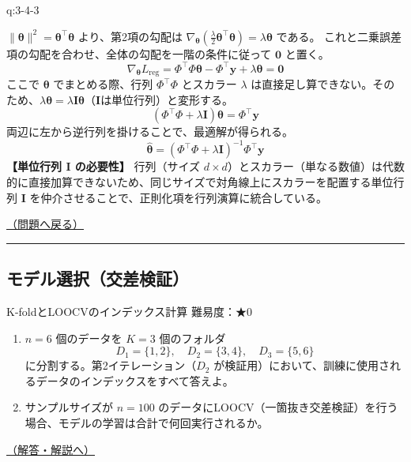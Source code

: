\begin{answerbox}[phantomlabel=a:3-4-3]{q:3-4-3}

\(\|\boldsymbol{\theta}\|^2 = \boldsymbol{\theta}^\top \boldsymbol{\theta}\)
より、第2項の勾配は
\(\nabla_{\boldsymbol{\theta}} \left( \frac{\lambda}{2} \boldsymbol{\theta}^\top \boldsymbol{\theta} \right) = \lambda \boldsymbol{\theta}\)
である。 これと二乗誤差項の勾配を合わせ、全体の勾配を一階の条件に従って
\(\mathbf{0}\) と置く。 \[
\nabla_{\boldsymbol{\theta}} L_{\text{reg}} = \Phi^\top \Phi \boldsymbol{\theta} - \Phi^\top \mathbf{y} + \lambda \boldsymbol{\theta} = \mathbf{0}
\] ここで \(\boldsymbol{\theta}\) でまとめる際、行列 \(\Phi^\top \Phi\)
とスカラー \(\lambda\)
は直接足し算できない。そのため、\(\lambda \boldsymbol{\theta} = \lambda \mathbf{I} \boldsymbol{\theta}\)（\(\mathbf{I}\)は単位行列）と変形する。
\[
(\Phi^\top \Phi + \lambda \mathbf{I})\boldsymbol{\theta} = \Phi^\top \mathbf{y}
\] 両辺に左から逆行列を掛けることで、最適解が得られる。 \[
\hat{\boldsymbol{\theta}} = (\Phi^\top \Phi + \lambda \mathbf{I})^{-1}\Phi^\top \mathbf{y}
\] \textbf{【単位行列 $\mathbf{I}$ の必要性】} 行列（サイズ
\(d \times d\)）とスカラー（単なる数値）は代数的に直接加算できないため、同じサイズで対角線上にスカラーを配置する単位行列
\(\mathbf{I}\) を仲介させることで、正則化項を行列演算に統合している。

\hfill 

\hyperref[q:3-4-3]{（問題へ戻る）}

\begin{center}\rule{0.5\linewidth}{0.5pt}\end{center}

\end{answerbox}

\subsection{モデル選択（交差検証）}\label{ux30e2ux30c7ux30ebux9078ux629eux4ea4ux5deeux691cux8a3c}

\begin{questionbox}[label=q:3-5-1]{K-foldとLOOCVのインデックス計算 \hfill \normalfont \small 難易度：★0}

\begin{enumerate}
\def\labelenumi{\arabic{enumi}.}
\tightlist
\item
  \(n=6\) 個のデータを \(K=3\) 個のフォルダ \[
       D_1 = \{1, 2\}, \quad D_2 = \{3, 4\}, \quad D_3 = \{5, 6\}
       \] に分割する。第2イテレーション（\(D_2\)
  が検証用）において、訓練に使用されるデータのインデックスをすべて答えよ。
\item
  サンプルサイズが \(n=100\)
  のデータにLOOCV（一箇抜き交差検証）を行う場合、モデルの学習は合計で何回実行されるか。
\end{enumerate}

\hfill 

\hyperref[a:3-5-1]{（解答・解説へ）}

\end{questionbox}

